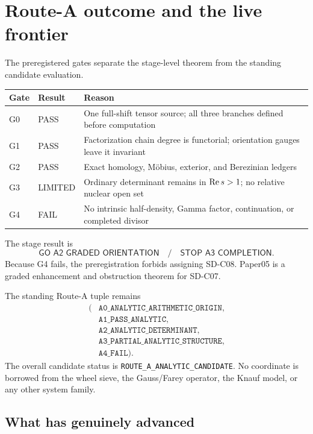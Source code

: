 \section{Route-A outcome and the live frontier}

The preregistered gates separate the stage-level theorem from the standing
candidate evaluation.

\begin{center}
\small
\begin{tabularx}{0.96\textwidth}{L{0.12\textwidth}L{0.18\textwidth}X}
\toprule
Gate & Result & Reason \\
\midrule
G0 & PASS & One full-shift tensor source; all three branches defined before computation \\
G1 & PASS & Factorization chain degree is functorial; orientation gauges leave it invariant \\
G2 & PASS & Exact homology, M\"obius, exterior, and Berezinian ledgers \\
G3 & LIMITED & Ordinary determinant remains in $\operatorname{Re} s>1$; no relative nuclear open set \\
G4 & FAIL & No intrinsic half-density, Gamma factor, continuation, or completed divisor \\
\bottomrule
\end{tabularx}
\end{center}

The stage result is
\[
\boxed{\textsf{GO A2 GRADED ORIENTATION}
\quad/\quad
\textsf{STOP A3 COMPLETION}.}
\]
Because G4 fails, the preregistration forbids assigning SD-C08. Paper05 is a
graded enhancement and obstruction theorem for SD-C07.

The standing Route-A tuple remains
\[
\begin{split}
(&\texttt{A0\_ANALYTIC\_ARITHMETIC\_ORIGIN},\\
 &\texttt{A1\_PASS\_ANALYTIC},\\
 &\texttt{A2\_ANALYTIC\_DETERMINANT},\\
 &\texttt{A3\_PARTIAL\_ANALYTIC\_STRUCTURE},\\
 &\texttt{A4\_FAIL}).
\end{split}
\]
The overall candidate status is
\texttt{ROUTE\_A\_ANALYTIC\_CANDIDATE}. No coordinate is borrowed from the
wheel sieve, the Gauss/Farey operator, the Knauf model, or any other system
family.

\subsection{What has genuinely advanced}

